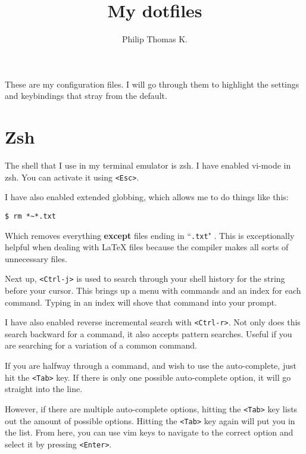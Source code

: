 \documentclass[12pt, a4paper]{article}
\title{My dotfiles}
\author{Philip Thomas K.}
\begin{document}
\maketitle

These are my configuration files.
I will go through them to highlight the settings and keybindings that stray from the default.

\section{Zsh}

The shell that I use in my terminal emulator is zsh.
I have enabled vi-mode in zsh.
You can activate it using \texttt{<Esc>}.

I have also enabled extended globbing, which allows me to do things like this:

\begin{center}
\verb|$ rm *~*.txt|
\end{center}

Which removes everything \textbf{except} files ending in ``\texttt{.txt}" .
This is exceptionally helpful when dealing with \LaTeX{} files because the compiler makes all sorts of unnecessary files.

Next up, \texttt{<Ctrl-j>} is used to search through your shell history for the string before your cursor.
This brings up a menu with commands and an index for each command.
Typing in an index will shove that command into your prompt.

I have also enabled reverse incremental search with \texttt{<Ctrl-r>}.
Not only does this search backward for a command, it also accepts pattern searches.
Useful if you are searching for a variation of a common command.

If you are halfway through a command, and wish to use the auto-complete, just hit the \texttt{<Tab>} key.
If there is only one possible auto-complete option, it will go straight into the line.

However, if there are multiple auto-complete options, hitting the \texttt{<Tab>} key lists out the amount of possible options.
Hitting the \texttt{<Tab>} key again will put you in the list.
From here, you can use vim keys to navigate to the correct option and select it by pressing \texttt{<Enter>}.
\end{document}
